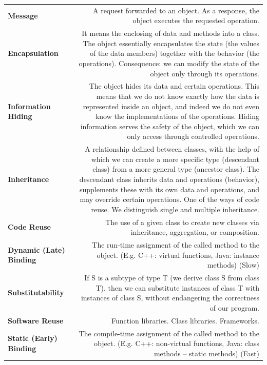 \documentclass[margin=0px]{article}
\begin{document}
\begin{longtable}{L R}
\textbf{Message} &
A request forwarded to an object. As a response, the object executes the requested operation. \\[4pt]

\textbf{Encapsulation} &
It means the enclosing of data and methods into a class. The object essentially encapsulates the state (the values of the data members) together with the behavior (the operations). Consequence: we can modify the state of the object only through its operations. \\[4pt]

\textbf{Information Hiding} &
The object hides its data and certain operations. This means that we do not know exactly how the data is represented inside an object, and indeed we do not even know the implementations of the operations. Hiding information serves the safety of the object, which we can only access through controlled operations. \\[4pt]

\textbf{Inheritance} &
A relationship defined between classes, with the help of which we can create a more specific type (descendant class) from a more general type (ancestor class). The descendant class inherits data and operations (behavior), supplements these with its own data and operations, and may override certain operations. One of the ways of code reuse. We distinguish single and multiple inheritance. \\[4pt]

\textbf{Code Reuse} &
The use of a given class to create new classes via inheritance, aggregation, or composition. \\[4pt]

\textbf{Dynamic (Late) Binding} &
The run-time assignment of the called method to the object. (E.g. C++: virtual functions, Java: instance methods) (Slow) \\[4pt]

\textbf{Substitutability} &
If S is a subtype of type T (we derive class S from class T), then we can substitute instances of class T with instances of class S, without endangering the correctness of our program. \\[4pt]

\textbf{Software Reuse} &
Function libraries. Class libraries. Frameworks. \\[4pt]

\textbf{Static (Early) Binding} &
The compile-time assignment of the called method to the object. (E.g. C++: non-virtual functions, Java: class methods -- static methods) (Fast) \\[4pt]


\end{longtable}
\end{document}
